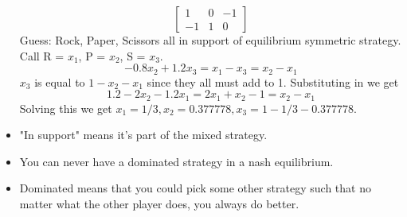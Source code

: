 \documentclass{article}
\begin{document}
\begin{itemize}
\[\begin{bmatrix}
    1 & 0 & -1 \\
    -1 & 1 & 0
  \end{bmatrix}\]
  Guess: Rock, Paper, Scissors all in support of equilibrium symmetric strategy. Call R = $x_1$, P = $x_2$, S = $x_3$. \[-0.8x_2+1.2x_3=x_1-x_3=x_2-x_1\]
  $x_3$ is equal to $1-x_2-x_1$ since they all must add to 1. Substituting in we get \[1.2-2x_2-1.2x_1=2x_1+x_2-1=x_2-x_1\]
  Solving this we get $x_1=1/3, x_2=0.377778, x_3=1-1/3-0.377778$.
  \item "In support" means it's part of the mixed strategy.
  \item You can never have a dominated strategy in a nash equilibrium.
  \item Dominated means that you could pick some other strategy such that no matter what the other player does, you always do better.
\end{itemize}
\end{document}

